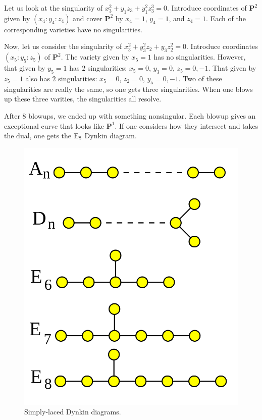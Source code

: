 \documentclass [11 pt, oneside, margin = 1 in] {article}
\begin{document}
\begin{example}
Let us look at the singularity of $x_3^2+y_1z_3+y_1^2z_3^3 =0 $. Introduce coordinates of $\mathbf{P}^2$ given by $(x_4:y_4:z_4)$ and cover $\mathbf{P}^2$ by $x_4=1$, $y_4=1$, and $z_4=1$. Each of the corresponding varieties have no singularities.

Now, let us consider the singularity of $x_3^2+y_3^2z_2+y_3z_2^2 =0$. Introduce coordinates $(x_5:y_5:z_5)$ of $\mathbf{P}^2$. The variety given by $x_5=1$ has no singularities. However, that given by $y_5=1$ has $2$ singularities: $x_5=0$, $y_3=0$, $z_5=0,-1$. That given by $z_5=1$ also has $2$ singularities: $x_5=0$, $z_2=0$, $y_5=0,-1$. Two of these singularities are really the same, so one gets three singularities. 
When one blows up these three varities, the singularities all resolve.
\end{example} 

After $8$ blowups, we ended up with something nonsingular. Each blowup gives an exceptional curve that looks like $\mathbf{P}^1$. If one considers how they intersect and takes the dual, one gets the $\operatorname{E}_8$ Dynkin diagram. 

\begin{figure}
	\begin{center}
		\includegraphics[scale=0.3]{images/simply_laced}
		\caption{Simply-laced Dynkin diagrams.}
	\end{center}
\end{figure}
\end{document}

